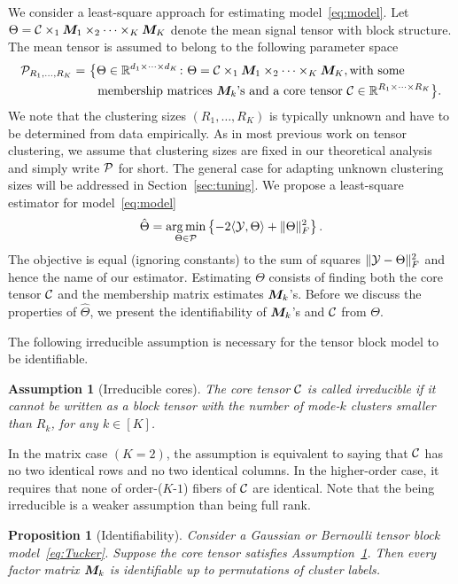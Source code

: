 \documentclass{article}
\newtheorem{prop}{Proposition}
\newtheorem{ass}{Assumption}
\begin{document}
We consider a least-square approach for estimating model~\eqref{eq:model}. Let $\Theta=\mathcal{C}\times_1\bm M_1\times_2\cdots\times_K\bm M_K$ denote the mean signal tensor with block structure. The mean tensor is assumed to belong to the following parameter space
\begin{align}\label{eq:space}
\mathcal{P}_{R_1,\ldots,R_K}=&\ \big\{ \Theta\in\mathbb{R}^{d_1\times \cdots \times d_K}\colon \Theta=\mathcal{C}\times_1\bm M_1\times_2\cdots\times_K\bm M_K, \text{with some}\\
 &\quad \text{membership matrices $\bm M_k$'s and a core tensor $\mathcal{C}\in\mathbb{R}^{R_1\times \cdots \times R_K}$}\big\}.
\end{align}
We note that the clustering sizes $(R_1,\ldots,R_K)$ is typically unknown and have to be determined from data empirically. As in most previous work on tensor clustering, we assume that clustering sizes are fixed in our theoretical analysis and simply write $\mathcal{P}$ for short. The general case for adapting unknown clustering sizes will be addressed in Section~\ref{sec:tuning}. We propose a least-square estimator for model~\eqref{eq:model}
\begin{equation}\label{eq:estimate}
\hat \Theta=\operatorname*{arg\,min}_{\Theta\in\mathcal{P}}\left\{ -2\langle \mathcal{Y},\Theta\rangle + \lVert\Theta\rVert_F^2\right\}.
\end{equation}
The objective is equal (ignoring constants) to the sum of squares $\lVert\mathcal{Y}-\Theta\rVert_F^2$ and hence the name of our estimator. Estimating $\Theta$ consists of finding both the core tensor $\mathcal{C}$ and the membership matrix estimates $\bm M_k$'s. Before we discuss the properties of $\hat \Theta$, we present the identifiability of $\bm M_k$'s and $\mathcal{C}$ from $\Theta$. 

The following irreducible assumption is necessary for the tensor block model to be identifiable. 
\begin{ass}[Irreducible cores]\label{ass:core}
The core tensor $\mathcal{C}$ is called irreducible if it cannot be written as a block tensor with the number of mode-$k$ clusters smaller than $R_k$, for any $k\in[K]$. 
\end{ass}
In the matrix case $(K=2)$, the assumption is equivalent to saying that $\mathcal{C}$ has no two identical rows and no two identical columns. In the higher-order case, it requires that none of order-($K$-$1$) fibers of $\mathcal{C}$ are identical. Note that the being irreducible is a weaker assumption than being full rank. 

\begin{prop}[Identifiability]\label{prop:factors}
Consider a Gaussian or Bernoulli tensor block model~\eqref{eq:Tucker}. Suppose the core tensor satisfies Assumption~\ref{ass:core}. Then every factor matrix $\bm M_k$ is identifiable up to permutations of cluster labels. 
\end{prop}
\end{document}
